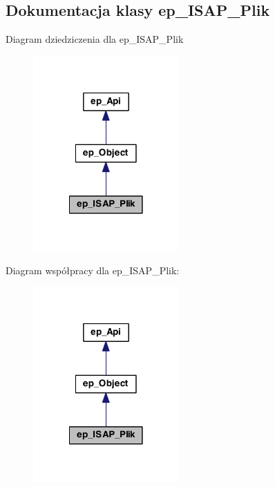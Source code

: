 \hypertarget{classep___i_s_a_p___plik}{\subsection{Dokumentacja klasy ep\-\_\-\-I\-S\-A\-P\-\_\-\-Plik}
\label{classep___i_s_a_p___plik}
}


Diagram dziedziczenia dla ep\-\_\-\-I\-S\-A\-P\-\_\-\-Plik\nopagebreak
\begin{figure}[H]
\begin{center}
\leavevmode
\includegraphics[width=158pt]{classep___i_s_a_p___plik__inherit__graph}
\end{center}
\end{figure}


Diagram współpracy dla ep\-\_\-\-I\-S\-A\-P\-\_\-\-Plik\-:\nopagebreak
\begin{figure}[H]
\begin{center}
\leavevmode
\includegraphics[width=158pt]{classep___i_s_a_p___plik__coll__graph}
\end{center}
\end{figure}
